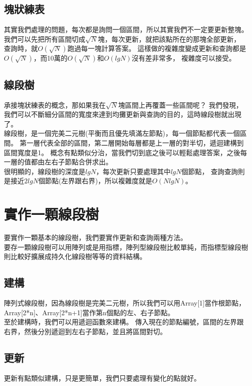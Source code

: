 \documentclass{article}
\begin{document}
\subsection{塊狀練表}
其實我們處理的問題，每次都是詢問一個區間，所以其實我們不一定要更新整塊。
我們可以先把所有區間切成$\sqrt N$塊，每次更新，就把該點所在的那塊全部更新，
查詢時，就$O(\sqrt N)$跑過每一塊計算答案。
這樣做的複雜度變成更新和查詢都是$O(\sqrt N)$，而10萬的$O(\sqrt N)$和$O(lg N)$沒有差非常多，
複雜度可以接受。

\subsection{線段樹}
承接塊狀練表的概念，那如果我在$\sqrt N$塊區間上再覆蓋一些區間呢？
我們發現，我們可以不斷細分區間的寬度來達到均攤更新與查詢的目的，這時線段樹就出現了。\\
線段樹，是一個完美二元樹(平衡而且優先填滿左節點)，每一個節點都代表一個區間。
第一層代表全部的區間，第二層開始每層都是上一層的對半切，遞迴建構到區間寬度是1。
概念有點類似分治，當我們切到底之後可以輕鬆處理答案，之後每一層的值都由左右子節點合併求出。\\
很明顯的，線段樹的深度是$lg N$，每次更新只要處理其中$lg N$個節點，
查詢查詢則是接近$2 lg N$個節點(左界跟右界)，所以複雜度就是$O(N lg N)$。

\section{實作一顆線段樹}
要實作一顆基本的線段樹，我們要實作更新和查詢兩種方法。\\
要存一顆線段樹可以用陣列或是用指標，陣列型線段樹比較單純，而指標型線段樹則比較好擴展成持久化線段樹等等的資料結構。\\

\subsection{建構}
陣列式線段樹，因為線段樹是完美二元樹，所以我們可以用Array[1]當作根節點，
Array[2*n]、Array[2*n+1]當作第n個點的左、右子節點。\\
至於建構時，我們可以用遞迴函數來建構。
傳入現在的節點編號，區間的左界跟右界，然後分別遞迴到左右子節點，並且將區間對切。

\subsection{更新}
更新有點類似建構，只是更簡單，我們只要處理有變化的點就好。
\end{document}
